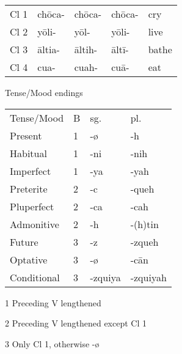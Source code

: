\documentclass[12pt]{beamer}
\newcommand{\nah}[1]{\textcolor{nahgrn}{#1}}
\newcommand{\trs}[1]{\textcolor{nahblu}{#1}}
\begin{document}
\begin{frame}
\begin{columns}[t]
\begin{column}{.18\linewidth}
\begin{example}
\begin{tabular}{lllll}
          Cl 1 & \nah{chōca-} & \nah{chōca-} & \nah{chōca-} & \trs{cry}   \\
          Cl 2 & \nah{yōli-}  & \nah{yōl-}   & \nah{yōli-}  & \trs{live}  \\
          Cl 3 & \nah{āltia-} & \nah{āltih-} & \nah{āltī-}  & \trs{bathe} \\
          Cl 4 & \nah{cua-}   & \nah{cuah-}  & \nah{cuā-}   & \trs{eat}  
        \end{tabular}
      \end{example}
      \begin{block}{Tense/Mood endings}
        \begin{threeparttable}
          \begin{tabular}{llll}
            Tense/Mood  & B & sg.             & pl.                        \\
            Present     & 1    & \nah{-ø}              & \nah{-h}               \\
            Habitual    & 1    & \nah{-ni}\tnote{1}   & \nah{-nih}\tnote{1}    \\
            Imperfect   & 1    & \nah{-ya}\tnote{2}   & \nah{-yah}             \\
            Preterite   & 2    & \nah{-c}\tnote{3}             & \nah{-queh}            \\
            Pluperfect  & 2    & \nah{-ca}            & \nah{-cah}             \\
            Admonitive  & 2    & \nah{-h}\tnote{3} & \nah{-(h)tin}\tnote{3} \\
            Future      & 3    & \nah{-z}             & \nah{-zqueh}           \\
            Optative    & 3    & \nah{-ø}              & \nah{-cān}             \\
            Conditional & 3    & \nah{-zquiya}        & \nah{-zquiyah}        
          \end{tabular}
          \begin{tablenotes}
          \item[1] Preceding V lengthened
          \item[2] Preceding V lengthened except Cl 1
          \item[3] Only Cl 1, otherwise \nah{-ø}
          \end{tablenotes}
        \end{threeparttable}
      \end{block}
    \end{column}

\end{columns}
\end{frame}
\end{document}
